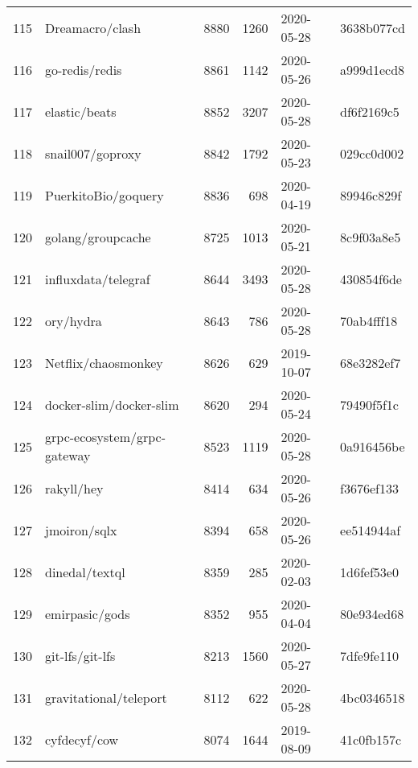 \begin{longtable}{llrrll}
    115 &                                    Dreamacro/clash &   8880 &   1260 & 2020-05-28 &  3638b077cd \\
    116 &                                     go-redis/redis &   8861 &   1142 & 2020-05-26 &  a999d1ecd8 \\
    117 &                                      elastic/beats &   8852 &   3207 & 2020-05-28 &  df6f2169c5 \\
    118 &                                   snail007/goproxy &   8842 &   1792 & 2020-05-23 &  029cc0d002 \\
    119 &                                PuerkitoBio/goquery &   8836 &    698 & 2020-04-19 &  89946c829f \\
    120 &                                  golang/groupcache &   8725 &   1013 & 2020-05-21 &  8c9f03a8e5 \\
    121 &                                influxdata/telegraf &   8644 &   3493 & 2020-05-28 &  430854f6de \\
    122 &                                          ory/hydra &   8643 &    786 & 2020-05-28 &  70ab4fff18 \\
    123 &                                Netflix/chaosmonkey &   8626 &    629 & 2019-10-07 &  68e3282ef7 \\
    124 &                            docker-slim/docker-slim &   8620 &    294 & 2020-05-24 &  79490f5f1c \\
    125 &                        grpc-ecosystem/grpc-gateway &   8523 &   1119 & 2020-05-28 &  0a916456be \\
    126 &                                         rakyll/hey &   8414 &    634 & 2020-05-26 &  f3676ef133 \\
    127 &                                       jmoiron/sqlx &   8394 &    658 & 2020-05-26 &  ee514944af \\
    128 &                                     dinedal/textql &   8359 &    285 & 2020-02-03 &  1d6fef53e0 \\
    129 &                                     emirpasic/gods &   8352 &    955 & 2020-04-04 &  80e934ed68 \\
    130 &                                    git-lfs/git-lfs &   8213 &   1560 & 2020-05-27 &  7dfe9fe110 \\
    131 &                             gravitational/teleport &   8112 &    622 & 2020-05-28 &  4bc0346518 \\
    132 &                                       cyfdecyf/cow &   8074 &   1644 & 2019-08-09 &  41c0fb157c \\

\end{longtable}
